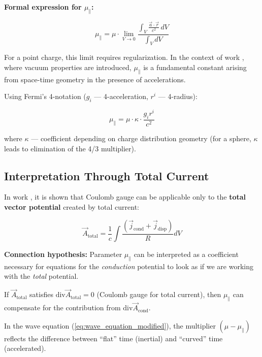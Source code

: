 \documentclass[12pt, a4paper]{article}
\begin{document}
\textbf{Formal expression for $\mu_{\parallel}$:}

\begin{equation}
\mu_{\parallel} = \mu \cdot \lim_{V \to 0} \frac{\int_V \frac{\vec{a} \cdot \vec{r}}{c^2} \, dV}{\int_V dV}
\label{eq:mu_parallel_formal}
\end{equation}

For a point charge, this limit requires regularization. In the context of work \cite{NikolaevLorentz}, where vacuum properties are introduced, $\mu_{\parallel}$ is a fundamental constant arising from space-time geometry in the presence of accelerations.

Using Fermi's 4-notation ($g_i$ --- 4-acceleration, $r^i$ --- 4-radius):

\begin{equation}
\mu_{\parallel} = \mu \cdot \kappa \cdot \frac{g_i r^i}{c^2}
\label{eq:mu_parallel_4vector}
\end{equation}

where $\kappa$ --- coefficient depending on charge distribution geometry (for a sphere, $\kappa$ leads to elimination of the 4/3 multiplier).

\subsection{Interpretation Through Total Current}

In work \cite{CoulombCalib}, it is shown that Coulomb gauge can be applicable only to the \textbf{total vector potential} created by total current:

\begin{equation}
\vec{A}_{\text{total}} = \frac{1}{c} \int \frac{(\vec{j}_{\text{cond}} + \vec{j}_{\text{disp}})}{R} dV
\label{eq:total_potential_again}
\end{equation}

\textbf{Connection hypothesis:} Parameter $\mu_{\parallel}$ can be interpreted as a coefficient necessary for equations for the \textit{conduction} potential to look as if we are working with the \textit{total} potential.

If $\vec{A}_{\text{total}}$ satisfies $\text{div} \vec{A}_{\text{total}} = 0$ (Coulomb gauge for total current), then $\mu_{\parallel}$ can compensate for the contribution from $\text{div} \vec{A}_{\text{cond}}$.

In the wave equation (\ref{eq:wave_equation_modified}), the multiplier $(\mu - \mu_{\parallel})$ reflects the difference between ``flat'' time (inertial) and ``curved'' time (accelerated).
\end{document}

